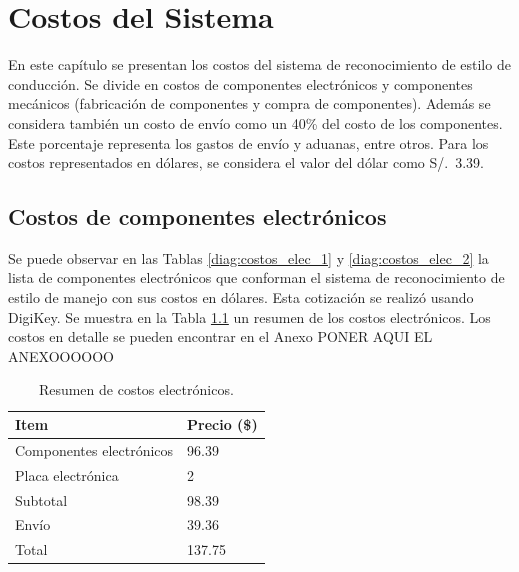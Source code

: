 \chapter{Costos del Sistema}

 \graphicspath{{Chapter6/Figuras/}{Chapter6/Figs/PDF/}{Chapter4/Figs/}}

En este capítulo se presentan los costos del sistema de reconocimiento de estilo de conducción. Se divide en costos de componentes electrónicos y componentes mecánicos (fabricación de componentes y compra de componentes). Además se considera también un costo de envío como un 40\% del costo de los componentes. Este porcentaje representa los gastos de envío y aduanas, entre otros. Para los costos representados en dólares, se considera el valor del dólar como \SI{3.39}[S/.]{}.

\section{Costos de componentes electrónicos}

Se puede observar en las Tablas \ref{diag:costos_elec_1} y \ref{diag:costos_elec_2} la lista de componentes electrónicos que conforman el sistema de reconocimiento de estilo de manejo con sus costos en dólares. Esta cotización se realizó usando DigiKey. Se muestra en la Tabla \ref{diag:costos_elec} un resumen de los costos electrónicos. Los costos en detalle se pueden encontrar en el Anexo PONER AQUI EL ANEXOOOOOO

\bgroup
\def\arraystretch{1.5}%
\begin{table}[htbp!]
\centering
\caption{Resumen de costos electrónicos.}
\begin{tabular}{|l|l|}
\hline
Item                     & Precio (\$) \\ \hline
Componentes electrónicos & 96.39       \\ \hline
Placa electrónica        & 2           \\ \hline
Subtotal                 & 98.39       \\ \hline
Envío                    & 39.36       \\ \hline
Total                    & 137.75      \\ \hline
\end{tabular}
\label{diag:costos_elec}
\end{table}
\egroup


